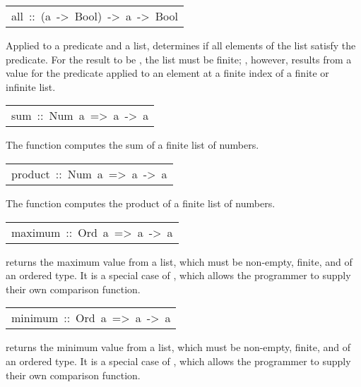 \begin{haddockdesc}
\item[\begin{tabular}{@{}l}
all\ ::\ (a\ ->\ Bool)\ ->\ {\char 91}a{\char 93}\ ->\ Bool
\end{tabular}]\haddockbegindoc
Applied to a predicate and a list,  determines if all elements
 of the list satisfy the predicate. For the result to be
 , the list must be finite; , however, results from a 
 value for the predicate applied to an element at a finite index of a finite or infinite list.
\par

\end{haddockdesc}
\begin{haddockdesc}
\item[\begin{tabular}{@{}l}
sum\ ::\ Num\ a\ =>\ {\char 91}a{\char 93}\ ->\ a
\end{tabular}]\haddockbegindoc
The  function computes the sum of a finite list of numbers.
\par

\end{haddockdesc}
\begin{haddockdesc}
\item[\begin{tabular}{@{}l}
product\ ::\ Num\ a\ =>\ {\char 91}a{\char 93}\ ->\ a
\end{tabular}]\haddockbegindoc
The  function computes the product of a finite list of numbers.
\par

\end{haddockdesc}
\begin{haddockdesc}
\item[\begin{tabular}{@{}l}
maximum\ ::\ Ord\ a\ =>\ {\char 91}a{\char 93}\ ->\ a
\end{tabular}]\haddockbegindoc
{} returns the maximum value from a list,
 which must be non-empty, finite, and of an ordered type.
 It is a special case of , which allows the
 programmer to supply their own comparison function.
\par

\end{haddockdesc}
\begin{haddockdesc}
\item[\begin{tabular}{@{}l}
minimum\ ::\ Ord\ a\ =>\ {\char 91}a{\char 93}\ ->\ a
\end{tabular}]\haddockbegindoc
{} returns the minimum value from a list,
 which must be non-empty, finite, and of an ordered type.
 It is a special case of , which allows the
 programmer to supply their own comparison function.
\par

\end{haddockdesc}
